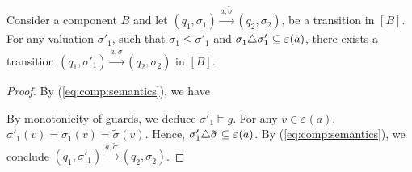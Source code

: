 \documentclass{llncs}
\newcommand{\eq}[1]{(\ref{eq:#1})}
\newcommand{\goesto}[2][]{\ensuremath{\xrightarrow[#1]{#2}}}
\newcommand{\val}[3][]{%
  \ensuremath{#1{\sigma}^{#2}_{#3}}%
}
\newcommand{\primeit}[1]{#1'}
\newcommand{\export}[1][]{\ensuremath{\varepsilon_{#1}}}
\newcommand{\valdiff}[2]{\ensuremath{#1 \triangle #2}}
\newcommand{\semopen}[1]{\ensuremath{[{#1}]}}
\newcommand{\order}{\leqslant}
\begin{document}
\begin{lemma}
  \label{lem:stepabove}
  Consider a component $B$ and let 
%
  $
  (q_1, \val{}{1})
%
  \goesto{a, \val[\tilde]{}{}}
%
  (q_2, \val{}{2})
  $,
%
  be a transition in $\semopen{B}$.  For any valuation
  $\val[\primeit]{}{1}$, such that
  $\val{}{1} \order \val[\primeit]{}{1}$ and
  $\valdiff{\val{}{1}}{\val[\primeit]{}{1}} \subseteq \export(a)$,
  there exists a transition
%
  $
  (q_1, \val[\primeit]{}{1})
%
  \goesto{a, \val[\tilde]{}{}}
%
  (q_2, \val{}{2})
  $
%
  in $\semopen{B}$.
\end{lemma}
%
\begin{proof}
  By \eq{comp:semantics}, we have
%

  By monotonicity of guards, we deduce
  $\val[\primeit]{}{1} \models g$.
  For any $v \in \export(a)$,
  $\val[\primeit]{}{1}(v) = \val{}{1}(v) = \val[\tilde]{}{}(v)$.
  Hence, 
  $\valdiff{\val[\primeit]{}{1}}{\val[\tilde]{}{}}
  \subseteq \export(a)$.
  By \eq{comp:semantics}, we conclude 
%
  $
  (q_1, \val[\primeit]{}{1})
%
  \goesto{a, \val[\tilde]{}{}}
%
  (q_2, \val{}{2})
  $.  
\end{proof}
\end{document}
